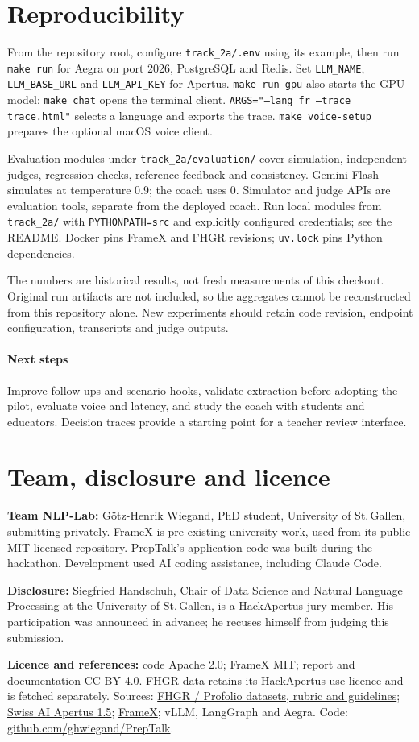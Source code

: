 \documentclass[10pt,a4paper]{article}
\newcommand{\repository}{\href{https://github.com/ghwiegand/PrepTalk}{github.com/ghwiegand/PrepTalk}}
\begin{document}
\section{Reproducibility}\label{sec:repro}
From the repository root, configure \texttt{track\_2a/.env} using its example, then run \texttt{make run}
for Aegra on port 2026, PostgreSQL and Redis. Set \texttt{LLM\_NAME}, \texttt{LLM\_BASE\_URL} and
\texttt{LLM\_API\_KEY} for Apertus. \texttt{make run-gpu} also starts the GPU model;
\texttt{make chat} opens the terminal client. \texttt{ARGS="--lang fr --trace trace.html"} selects a
language and exports the trace. \texttt{make voice-setup} prepares the optional macOS voice client.

Evaluation modules under \texttt{track\_2a/evaluation/} cover simulation, independent judges, regression
checks, reference feedback and consistency. Gemini Flash simulates at temperature 0.9; the coach uses 0.
Simulator and judge APIs are evaluation tools, separate from the deployed coach. Run local modules from
\texttt{track\_2a/} with \texttt{PYTHONPATH=src} and explicitly configured credentials; see the README.
Docker pins FrameX and FHGR revisions; \texttt{uv.lock} pins Python dependencies.

The numbers are historical results, not fresh measurements of this checkout. Original run artifacts are
not included, so the aggregates cannot be reconstructed from this repository alone. New experiments
should retain code revision, endpoint configuration, transcripts and judge outputs.

\paragraph{Next steps}
Improve follow-ups and scenario hooks, validate extraction before adopting the pilot, evaluate voice
and latency, and study the coach with students and educators. Decision traces provide a starting point
for a teacher review interface.

\section*{Team, disclosure and licence}
\textbf{Team NLP-Lab:} Götz-Henrik Wiegand, PhD student, University of St.\,Gallen, submitting privately.
FrameX is pre-existing university work, used from its public MIT-licensed repository.
PrepTalk's application code was built during the hackathon. Development used AI coding
assistance, including Claude Code.

\textbf{Disclosure:} Siegfried Handschuh, Chair of Data Science and Natural Language Processing at the
University of St.\,Gallen, is a HackApertus jury member. His participation was announced in advance;
he recuses himself from judging this submission.

\textbf{Licence and references:} code Apache 2.0; FrameX MIT; report and documentation CC BY 4.0.
FHGR data retains its HackApertus-use licence and is fetched separately. Sources:
\href{https://github.com/fhgr/Hackapertus}{FHGR / Profolio datasets, rubric and guidelines};
\href{https://huggingface.co/swiss-ai/Apertus-v1.5-8B}{Swiss AI Apertus 1.5};
\href{https://gitlab.com/ds-unisg/framex-core}{FrameX}; vLLM, LangGraph and Aegra.
Code: \repository{}.
\end{document}
